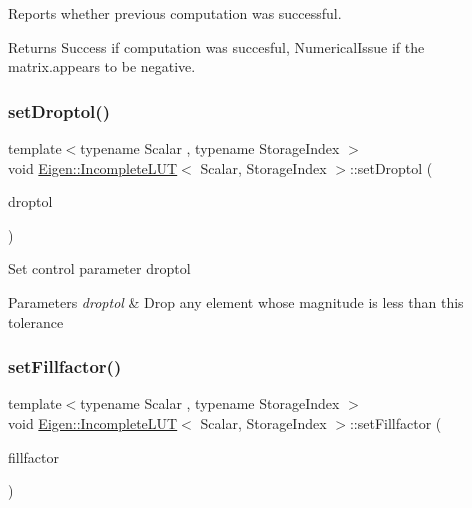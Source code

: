 Reports whether previous computation was successful. 

\begin{DoxyReturn}{Returns}
{\ttfamily Success} if computation was succesful, {\ttfamily Numerical\+Issue} if the matrix.\+appears to be negative. 
\end{DoxyReturn}
\mbox{\label{class_eigen_1_1_incomplete_l_u_t_a9628c5a595e9e984c72d1f8e671a6925}} 
\subsubsection{\texorpdfstring{setDroptol()}{setDroptol()}}
{\footnotesize\ttfamily template$<$typename Scalar , typename Storage\+Index $>$ \\
void \mbox{\hyperlink{class_eigen_1_1_incomplete_l_u_t}{Eigen\+::\+Incomplete\+L\+UT}}$<$ Scalar, Storage\+Index $>$\+::set\+Droptol (\begin{DoxyParamCaption}\item[{const Real\+Scalar \&}]{droptol }\end{DoxyParamCaption})}

Set control parameter droptol 
\begin{DoxyParams}{Parameters}
{\em droptol} & Drop any element whose magnitude is less than this tolerance \\
\hline
\end{DoxyParams}
\mbox{\label{class_eigen_1_1_incomplete_l_u_t_a327767d12b55ff8a023f12a030051e17}} 
\subsubsection{\texorpdfstring{setFillfactor()}{setFillfactor()}}
{\footnotesize\ttfamily template$<$typename Scalar , typename Storage\+Index $>$ \\
void \mbox{\hyperlink{class_eigen_1_1_incomplete_l_u_t}{Eigen\+::\+Incomplete\+L\+UT}}$<$ Scalar, Storage\+Index $>$\+::set\+Fillfactor (\begin{DoxyParamCaption}\item[{int}]{fillfactor }\end{DoxyParamCaption})}

